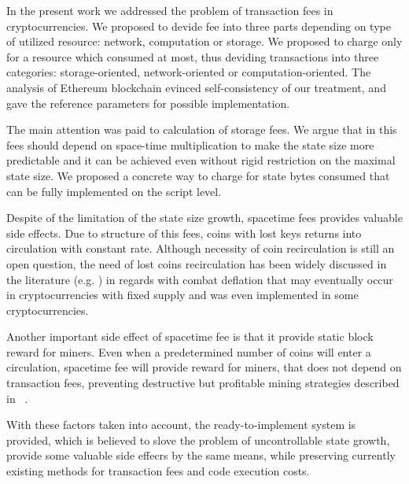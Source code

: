 \documentclass[]{llncs}   %
\begin{document}
In the present work we addressed the problem of transaction fees in cryptocurrencies.
We proposed to devide fee into three parts depending on type of utilized resource:
network, computation or storage. We proposed to charge only for a resource which
consumed at most, thus deviding transactions into three categories: storage-oriented,
network-oriented or computation-oriented. The analysis of Ethereum blockchain evinced
self-consistency of our treatment, and gave the reference parameters for possible implementation.

The main attention was paid to calculation of storage fees. We argue that in
this fees should depend on space-time multiplication to make the state size
more predictable and it can be achieved even without rigid restriction on the
maximal state size. We proposed a concrete way to charge for state bytes consumed
that can be fully implemented on the script level.

Despite of the limitation of the state size growth, spacetime fees provides valuable side effects.
Due to structure of this fees, coins with lost keys returns into circulation with constant rate.
Although necessity of coin recirculation is still an open question, the need of lost coins recirculation
has been widely discussed in the literature (e.g. \cite{gjermundrod2014recirculating,gjermundrod2016going})
in regards with combat deflation that may eventually occur in cryptocurrencies with fixed supply and
was even implemented in some cryptocurrencies\cite{freicoin}.

Another important side effect of spacetime fee is that it provide static block reward
for miners. Even when a predetermined number of coins will enter a circulation,
spacetime fee will provide reward for miners, that does not depend on transaction
fees, preventing destructive but profitable mining strategies described in
~\cite{carlsten2016instability}.

With these factors taken into account, the ready-to-implement system is provided,
which is believed to slove the problem of uncontrollable state growth, provide some
valuable side effecrs by the same means, while preserving currently existing
methods for transaction fees and code execution costs.
\end{document}
